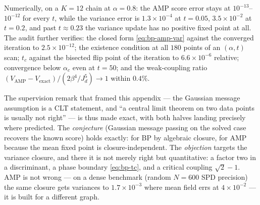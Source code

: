 Numerically, on a $K = 12$ chain at $\alpha = 0.8$: the AMP score error
stays at $10^{-13}$--$10^{-12}$ for every $t$, while the variance error is
$1.3 \times 10^{-4}$ at $t = 0.05$, $3.5 \times 10^{-2}$ at $t = 0.2$, and
past $t \approx 0.23$ the variance update has no positive fixed point at
all. The audit further verifies: the closed form \eqref{eq:bp-amp-var}
against the converged iteration to $2.5 \times 10^{-12}$; the existence
condition at all $180$ points of an $(\alpha, t)$ scan; $t_c$ against the
bisected flip point of the iteration to $6.6 \times 10^{-6}$ relative;
convergence below $\alpha_c$ even at $t = 50$; and the weak-coupling ratio
$(V_{\mathrm{AMP}} - V_{\mathrm{exact}})/(2\beta^4/J_d^5) \to 1$ within
$0.4\%$.

The supervision remark that framed this appendix --- the Gaussian message
assumption is a CLT statement, and ``a central limit theorem on two data
points is usually not right'' --- is thus made exact, with both halves
landing precisely where predicted. The \emph{conjecture} (Gaussian message
passing on the solved case recovers the known score) holds exactly: for BP
by algebraic closure, for AMP because the mean fixed point is
closure-independent. The \emph{objection} targets the variance closure,
and there it is not merely right but quantitative: a factor two in a
discriminant, a phase boundary \eqref{eq:bp-tc}, and a critical coupling
$\sqrt{2} - 1$. AMP is not wrong --- on a dense benchmark (random
$N = 600$ SPD precision) the same closure gets variances to
$1.7 \times 10^{-3}$ where mean field errs at $4 \times 10^{-2}$ --- it is
built for a different graph.

